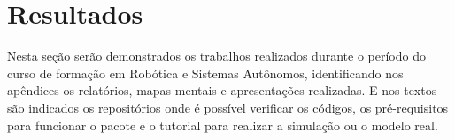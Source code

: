 \chapter{Resultados}
\label{chap:result}
Nesta seção serão demonstrados os trabalhos realizados durante o período do curso de formação em Robótica e Sistemas Autônomos, identificando nos apêndices os relatórios, mapas mentais e apresentações realizadas. E nos textos são indicados os repositórios onde é possível verificar os códigos, os pré-requisitos para funcionar o pacote e o tutorial para realizar a simulação ou o modelo real.



